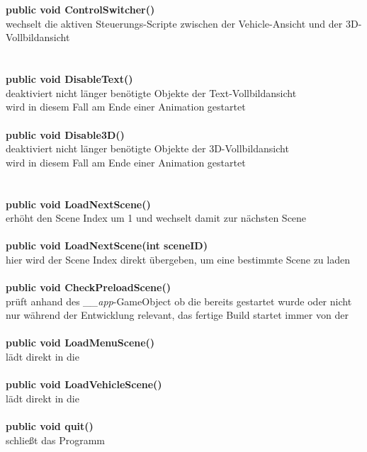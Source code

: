 \section{\ctlsc}
\label{sec:csc}
%
\textbf{public void ControlSwitcher()}\\
wechselt die aktiven Steuerungs-Scripte zwischen der Vehicle-Ansicht und der 3D-Vollbildansicht\\
%
\section{\doc}
%
\textbf{public void DisableText()}\\
deaktiviert nicht länger benötigte Objekte der Text-Vollbildansicht\\
wird in diesem Fall am Ende einer Animation gestartet\\
\\
\textbf{public void Disable3D()}\\
deaktiviert nicht länger benötigte Objekte der 3D-Vollbildansicht\\
wird in diesem Fall am Ende einer Animation gestartet\\
%
\section{\slc}
%
\textbf{public void LoadNextScene()}\\
erhöht den Scene Index um 1 und wechselt damit zur nächsten Scene\\
\\
\textbf{public void LoadNextScene(int sceneID)}\\
hier wird der Scene Index direkt übergeben, um eine bestimmte Scene zu laden\\
\\
\textbf{public void CheckPreloadScene()}\\
prüft anhand des \emph{\_\_app}-GameObject ob die \pres{} bereits gestartet wurde oder nicht\\
nur während der Entwicklung relevant, das fertige Build startet immer von der \pres{}\\
\\
\textbf{public void LoadMenuScene()}\\
lädt direkt in die \mms\\
\\
\textbf{public void LoadVehicleScene()}\\
lädt direkt in die \vhs\\
\\
\textbf{public void quit()}\\
schließt das Programm
%
